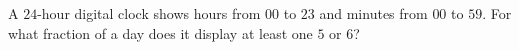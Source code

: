A $24$-hour digital clock shows hours from $00$ to $23$ and minutes from $00$ to $59$. For what fraction of a day does it display at least one $5$ or $6$?
